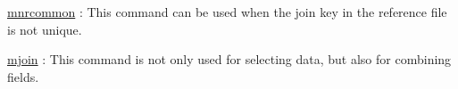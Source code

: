 \hyperref[sect:mnrcommon]{mnrcommon} : This command can be used when the join key in the reference file is not unique. 

\hyperref[sect:mjoin]{mjoin} : This command is not only used for selecting data, but also for combining fields. 


%
